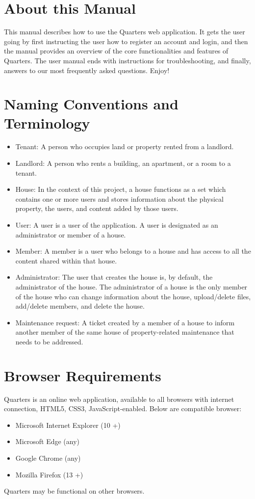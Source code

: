 \documentclass[12pt]{article}
\begin{document}
    \section{About this Manual}
    This manual describes how to use the Quarters web application. It gets the user going by first instructing the user how to register an account and login, and then the manual provides an overview of the core functionalities and features of Quarters. The user manual ends with instructions for troubleshooting, and finally, answers to our most frequently asked questions. Enjoy!

    \section{Naming Conventions and Terminology}
    \label{sec:conventions}
    \begin{itemize}
    \item Tenant: A person who occupies land or property rented from a landlord.
    \item Landlord: A person who rents a building, an apartment, or a room to a tenant.
    \item House: In the context of this project, a house functions as a set
      which contains one or more users and stores information about the
      physical property, the users, and content added by those users.
    \item User: A user is a user of the application. A user is designated as an administrator or member of a house.
    \item Member: A member is a user who belongs to a house and has access to all the content shared within that house.
    \item Administrator: The user that creates the house is, by default, the administrator of the house. The administrator of a house is the only member of the house who can change information about the house, upload/delete files, add/delete members, and delete the house.
    \item Maintenance request: A ticket created by a member of a house to inform another member of the same house of property-related maintenance that needs to be addressed.
    \end{itemize}

    \section{Browser Requirements}
    \label{sec:browserRequirement}
    Quarters is an online web application, available to all browsers with internet connection, HTML5, CSS3, JavaScript-enabled. Below are compatible browser:
    \begin{itemize}
        \item Microsoft Internet Explorer (10 +)
        \item Microsoft Edge (any)
        \item Google Chrome (any)
        \item Mozilla Firefox (13 +)
    \end{itemize}
    Quarters may be functional on other browsers.
\end{document}
